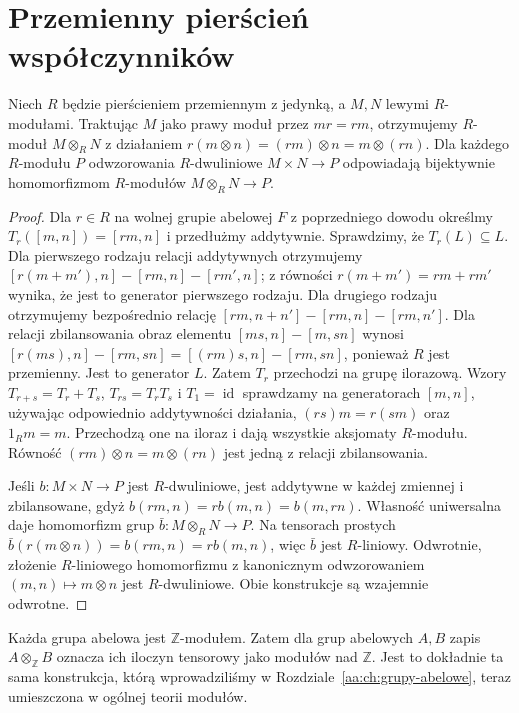 \section{Przemienny pierścień współczynników}
\begin{twierdzenie}
\label{aa:tw:tensor-commutative-module}
Niech $R$ będzie pierścieniem przemiennym z jedynką,
a $M,N$ lewymi $R$-modułami. Traktując $M$ jako prawy
moduł przez $mr=rm$, otrzymujemy $R$-moduł
$M\otimes_R N$ z działaniem
$r(m\otimes n)=(rm)\otimes n=m\otimes(rn)$.
Dla każdego $R$-modułu $P$ odwzorowania $R$-dwuliniowe
$M\times N\to P$ odpowiadają bijektywnie homomorfizmom
$R$-modułów $M\otimes_RN\to P$.
\end{twierdzenie}
\begin{proof}
Dla $r\in R$ na wolnej grupie abelowej $F$ z poprzedniego
dowodu określmy $T_r([m,n])=[rm,n]$ i przedłużmy
addytywnie. Sprawdzimy, że $T_r(L)\subseteq L$.
Dla pierwszego rodzaju relacji addytywnych otrzymujemy
$[r(m+m'),n]-[rm,n]-[rm',n]$; z równości
$r(m+m')=rm+rm'$ wynika, że jest to generator
pierwszego rodzaju. Dla drugiego rodzaju
otrzymujemy bezpośrednio relację
$[rm,n+n']-[rm,n]-[rm,n']$. Dla relacji zbilansowania
obraz elementu $[ms,n]-[m,sn]$ wynosi
$[r(ms),n]-[rm,sn]=[(rm)s,n]-[rm,sn]$,
ponieważ $R$ jest przemienny. Jest to generator $L$.
Zatem $T_r$ przechodzi na grupę ilorazową.
Wzory $T_{r+s}=T_r+T_s$, $T_{rs}=T_rT_s$
i $T_1=\operatorname{id}$ sprawdzamy na generatorach
$[m,n]$, używając odpowiednio addytywności działania,
$(rs)m=r(sm)$ oraz $1_Rm=m$. Przechodzą one na
iloraz i dają wszystkie aksjomaty $R$-modułu.
Równość $(rm)\otimes n=m\otimes(rn)$ jest
jedną z relacji zbilansowania.

Jeśli $b:M\times N\to P$ jest $R$-dwuliniowe,
jest addytywne w każdej zmiennej i zbilansowane,
gdyż $b(rm,n)=rb(m,n)=b(m,rn)$.
Własność uniwersalna daje homomorfizm grup
$\bar b:M\otimes_RN\to P$. Na tensorach prostych
$\bar b(r(m\otimes n))=b(rm,n)=rb(m,n)$,
więc $\bar b$ jest $R$-liniowy. Odwrotnie, złożenie
$R$-liniowego homomorfizmu z kanonicznym odwzorowaniem
$(m,n)\mapsto m\otimes n$ jest $R$-dwuliniowe.
Obie konstrukcje są wzajemnie odwrotne.
\end{proof}

\begin{przyklad}
\label{aa:prz:tensor-abelian-example}
Każda grupa abelowa jest $\mathbb Z$-modułem.
Zatem dla grup abelowych $A,B$ zapis
$A\otimes_{\mathbb Z}B$ oznacza ich iloczyn tensorowy
jako modułów nad $\mathbb Z$. Jest to dokładnie
ta sama konstrukcja, którą wprowadziliśmy w
Rozdziale~\ref{aa:ch:grupy-abelowe}, teraz
umieszczona w ogólnej teorii modułów.
\end{przyklad}

